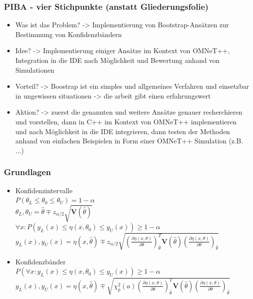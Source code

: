 \documentclass[aspectratio=1610, 9pt]{beamer}
\begin{document}
\begin{frame}
  \frametitle{PIBA - vier Stichpunkte (anstatt Gliederungsfolie)}
  \begin{itemize}
    \item Was ist das Problem? -> Implementierung von Bootstrap-Ansätzen zur Bestimmung von Konfidenzbändern
    \item Idee? -> Implementierung einiger Ansätze im Kontext von OMNeT++, Integration in die IDE nach Möglichkeit und Bewertung anhand von Simulationen
    \item Vorteil? -> Boostrap ist ein simples und allgemeines Verfahren und einsetzbar in ungewissen situationen -> die arbeit gibt einen erfahrungswert
    \item Aktion? -> zuerst die genannten und weitere Ansätze genauer recherchieren und vorstellen, dann in C++ im Kontext von OMNeT++ implementieren und nach Möglichkeit in die IDE integrieren, dann testen der Methoden anhand von einfachen Beispielen in Form einer OMNeT++ Simulation (z.B. ...)
  \end{itemize}
\end{frame}

\begin{frame}
  \frametitle{Grundlagen}
  \begin{itemize}
    \item Konfidenzintervalle \\
    $P\left( \theta_L \le \theta_0 \le \theta_U \right) = 1-\alpha$
    \\
    $\theta_L, \theta_U = \hat\theta \mp z_{\alpha/2}\sqrt{\mathbf{V}(\hat\theta)}$
    \\
    $\forall x: P\left(y_L(x) \le \eta(x, \theta_0) \le y_U(x)\right) \geq 1-\alpha$
    \\
    $y_L(x), y_U(x) = \eta(x, \hat\theta) \mp 
    z_{\alpha/2}
    \sqrt{
      \left(
        \frac{\partial\eta(x, \theta)}{\partial\theta}
      \right)_{\hat\theta}^T
      \mathbf{V}(\hat\theta)
      \left(
        \frac{\partial\eta(x, \theta)}{\partial\theta}
      \right)_{\hat\theta}
    }$
    \item Konfidenzbänder \\
    $P\left(\forall x: y_L(x) \le \eta(x, \theta_0) \le y_U(x) \right ) \geq 1-\alpha$
    \\
    $y_L(x), y_U(x) = \eta(x, \hat\theta) \mp 
    \sqrt{
      \chi_p^2(a)
      \left(
        \frac{\partial\eta(x, \theta)}{\partial\theta}
      \right)_{\hat\theta}^T
      \mathbf{V}(\hat\theta)
      \left(
        \frac{\partial\eta(x, \theta)}{\partial\theta}
      \right)_{\hat\theta}
    }$
  \end{itemize}
\end{frame}
\end{document}
